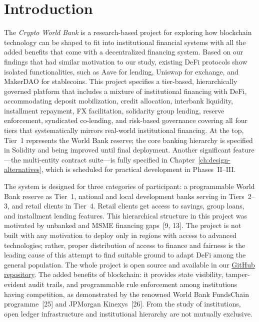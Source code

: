 \documentclass[12pt,a4paper]{report}
\begin{document}
\newpage
{}
\setcounter{page}{1}


\chapter{Introduction}
\label{sec:intro}

The \textit{Crypto World Bank} is a research-based project for exploring how blockchain technology can be shaped to fit into institutional financial systems with all the added benefits that come with a decentralized financing system. Based on our findings that had similar motivation to our study, existing DeFi protocols show isolated functionalities, such as Aave for lending, Uniswap for exchange, and MakerDAO for stablecoins. This project specifies a tier-based, hierarchically governed platform that includes a mixture of institutional financing with DeFi, accommodating deposit mobilization, credit allocation, interbank liquidity, installment repayment, FX facilitation, solidarity group lending, reserve enforcement, syndicated co-lending, and risk-based governance covering all four tiers that systematically mirrors real-world institutional financing. At the top, Tier~1 represents the World Bank reserve; the core banking hierarchy is specified in Solidity and being improved until final deployment. Another significant feature---the multi-entity contract suite---is fully specified in Chapter~\ref{ch:design-alternatives}, which is scheduled for practical development in Phases~II--III.

The system is designed for three categories of participant: a programmable World Bank reserve as Tier~1, national and local development banks serving in Tiers~2--3, and retail clients in Tier~4. Retail clients get access to savings, group loans, and installment lending features. This hierarchical structure in this project was motivated by unbanked and MSME financing gaps~[9, 13]. The project is not built with any motivation to deploy only in regions with access to advanced technologies; rather, proper distribution of access to finance and fairness is the leading cause of this attempt to find suitable ground to adapt DeFi among the general population. The whole project is open source and available in our \href{https://github.com/Yuvraajrahman/Cryto-World-Bank}{GitHub repository}. The added benefits of blockchain: it provides state visibility, tamper-evident audit trails, and programmable rule enforcement among institutions having competition, as demonstrated by the renowned World Bank FundsChain programme~[25] and JPMorgan Kinexys~[26]. From the study of institutions, open ledger infrastructure and institutional hierarchy are not mutually exclusive.
\end{document}
